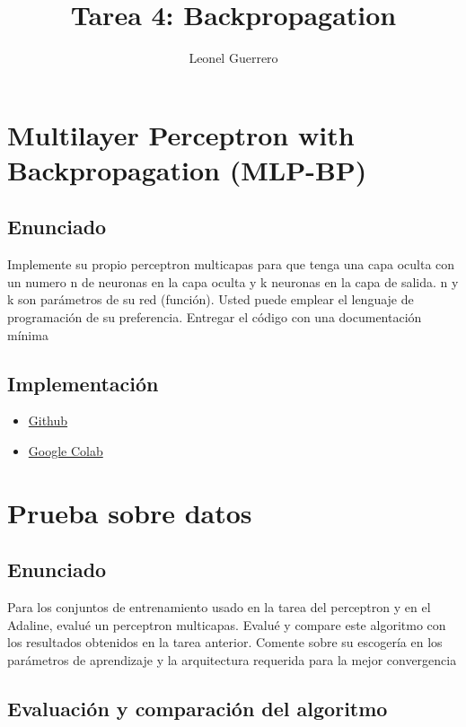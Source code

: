 \documentclass{article}
\title{Tarea 4: Backpropagation}
\author{Leonel Guerrero}
\theoremstyle{mytheoremstyle}
\theoremstyle{mytheoremstyle}
\theoremstyle{myproblemstyle}
\begin{document}
\maketitle


\section{Multilayer Perceptron with Backpropagation (MLP-BP)}

\subsection{Enunciado}
Implemente su propio perceptron multicapas para que tenga una capa oculta con un numero n de neuronas en la capa oculta y k neuronas en la capa de salida. n y k son parámetros de su red (función). Usted puede emplear el lenguaje de programación de su preferencia. Entregar el código con una documentación mínima

\subsection{Implementación}

\begin{itemize}
  \item \href{https://github.com/LeoGCode/Tarea-4--Backpropagation}{Github}
  \item \href{https://colab.research.google.com/drive/1c8swOFZ_sL5bQSOi91ajNDod2Arv-0x6?usp=sharing}{Google Colab}
\end{itemize}

\section{Prueba sobre datos}

\subsection{Enunciado}
Para los conjuntos de entrenamiento usado  en la tarea del perceptron y en el Adaline, evalué un perceptron multicapas. Evalué y compare este algoritmo con los resultados obtenidos en la tarea anterior. Comente sobre su escogería en los parámetros de aprendizaje y la arquitectura requerida para la mejor convergencia

\subsection{Evaluación y comparación del algoritmo}
\end{document}
